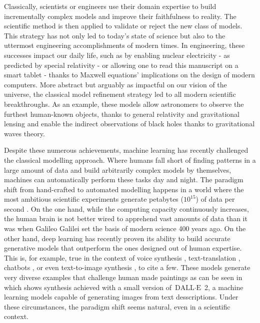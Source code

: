 Classically, scientists or engineers use their domain expertise to build incrementally complex models and improve their faithfulness to reality. The scientific method is then applied to validate or reject the new class of models. This strategy has not only led to today's state of science but also to the uttermost engineering accomplishments of modern times. In engineering, these successes impact our daily life, such as by enabling nuclear electricity - as predicted by special relativity - or allowing one to read this manuscript on a smart tablet - thanks to Maxwell equations' implications on the design of modern computers. More abstract but arguably as impactful on our vision of the universe, the classical model refinement strategy led to all modern scientific breakthroughs. As an example, these models allow astronomers to observe the furthest human-known objects, thanks to general relativity and gravitational lensing and enable the indirect observations of black holes thanks to gravitational waves theory.

Despite these numerous achievements, machine learning has recently challenged the classical modelling approach. Where humans fall short of finding patterns in a large amount of data and build arbitrarily complex models by themselves, machines can automatically perform these tasks day and night. The paradigm shift from hand-crafted to automated modelling happens in a world where the most ambitious scientific experiments generate petabytes ($10^{15}$) of data per second \citep{noauthor_cern_nodate}. On the one hand, while the computing capacity continuously increases, the human brain is not better wired to apprehend vast amounts of data than it was when Galileo Galilei set the basis of modern science 400 years ago. On the other hand, deep learning has recently proven its ability to build accurate generative models that outperform the ones designed out of human expertise. This is, for example, true in the context of voice synthesis \citep{van_den_oord_wavenet_2016}, text-translation \citep{brown2020language, devlin2018bert}, chatbots \citep{alayrac2022flamingo}, or even text-to-image synthesis \citep{ramesh2022hierarchical, saharia2022photorealistic}, to cite a few. These models generate very diverse examples that challenge human made paintings as can be seen in  which shows synthesis achieved with a small version of $\text{DALL}\cdot\text{E}$ 2, a machine learning models capable of generating images from text desscriptions. Under these circumstances, the paradigm shift seems natural, even in a scientific context.



